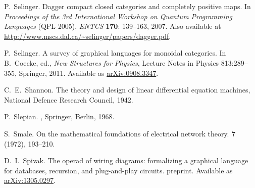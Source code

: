 \begin{thebibliography}{RSW00}
    P.\ Selinger.
    \newblock Dagger compact closed categories and completely
    positive maps.
    \newblock In {\sl Proceedings of the 3rd International Workshop on
    Quantum Programming Languages} (QPL 2005), {\sl ENTCS} {\bf 170}:
    139--163, 2007.
    \newblock Also available at
    \href{http://www.mscs.dal.ca/~selinger/papers/dagger.pdf}{http://www.mscs.dal.ca/\~{}selinger/papers/dagger.pdf}.

    P.\ Selinger.
    \newblock A survey of graphical languages
    for monoidal categories.
    \newblock In B.\ Coecke, ed., \emph{New Structures for
    Physics}, Lecture Notes in Physics 813:289--355, Springer, 2011.
    \newblock Available
    as \href{http://arxiv.org/abs/0908.3347}{arXiv:0908.3347}.

    C.\ E.\ Shannon.
    \newblock The theory and design of linear differential equation machines, National Defence Research Council, 1942.


    P.\ Slepian.
    , Springer, Berlin, 1968. 

    S.\ Smale.
    \newblock On the mathematical foundations of electrical
    network theory.
     {\bf 7} (1972), 193--210. 




    D.\ I.\  Spivak.
    \newblock The operad of wiring diagrams:
    formalizing a graphical language for databases, recursion, and plug-and-play
    circuits.
    \newblock preprint.
    \newblock Available as
    \href{http://arxiv.org/abs/1305.0297}{arXiv:1305.0297}.


\end{thebibliography}
